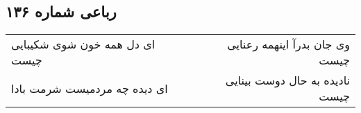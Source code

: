 \begin{center}
\section*{رباعی شماره ۱۳۶}
\label{sec:sh136}
\begin{longtable}{l p{0.5cm} r}
ای دل همه خون شوی شکیبایی چیست
&&
وی جان بدرآ اینهمه رعنایی چیست
\\
ای دیده چه مردمیست شرمت بادا
&&
نادیده به حال دوست بینایی چیست
\\
\end{longtable}
\end{center}
